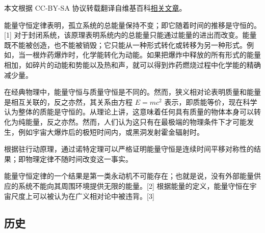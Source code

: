 
本文根据 CC-BY-SA 协议转载翻译自维基百科\href{https://en.wikipedia.org/wiki/Conservation_of_energy}{相关文章}。

能量守恒定律表明，孤立系统的总能量保持不变；即它随着时间的推移是守恒的。[1] 对于封闭系统，该原理表明系统内的总能量只能通过能量的进出而改变。能量既不能被创造，也不能被销毁；它只能从一种形式转化或转移为另一种形式。例如，当一根炸药爆炸时，化学能转化为动能。如果把爆炸中释放的所有形式的能量相加，如碎片的动能和势能以及热和声，就可以得到炸药燃烧过程中化学能的精确减少量。

在经典物理中，能量守恒与质量守恒是不同的。然而，狭义相对论表明质量和能量是相互关联的，反之亦然，其关系由方程 \( E = mc^2 \) 表示，即质能等价，现在科学认为整体的质能是守恒的。从理论上讲，这意味着任何具有质量的物体本身可以转化为纯能量，反之亦然。然而，人们认为这只有在最极端的物理条件下才可能发生，例如宇宙大爆炸后的极短时间内，或黑洞发射霍金辐射时。

根据驻行动原理，通过诺特定理可以严格证明能量守恒是连续时间平移对称性的结果；即物理定律不随时间改变这一事实。

能量守恒定律的一个结果是第一类永动机不可能存在；也就是说，没有外部能量供应的系统不能向其周围环境提供无限的能量。[2] 根据能量的定义，能量守恒在宇宙尺度上可以被认为在广义相对论中被违背。[3]
\subsection{历史}

